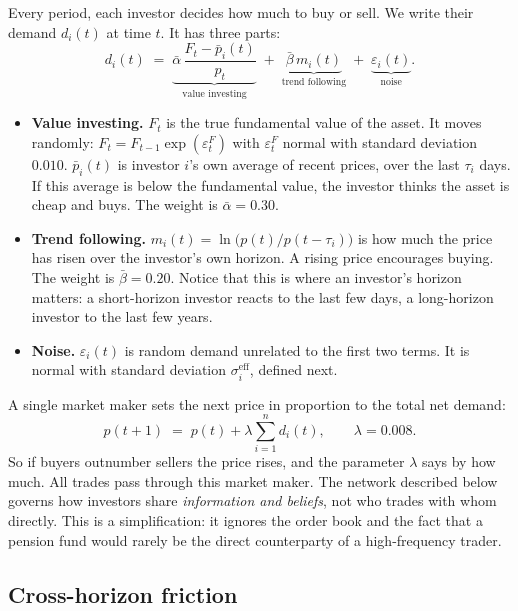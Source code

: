Every period, each investor decides how much to buy or sell. We write their demand $d_i(t)$ at time $t$. It has three parts:
\begin{equation}
d_i(t) \;=\; \underbrace{\bar\alpha\,\frac{F_t-\bar p_i(t)}{p_t}}_{\text{value investing}}
\;+\; \underbrace{\bar\beta\, m_i(t)}_{\text{trend following}}
\;+\; \underbrace{\varepsilon_i(t)}_{\text{noise}} .
\label{eq:demand}
\end{equation}

\begin{itemize}[leftmargin=*]
\item \textbf{Value investing.} $F_t$ is the true fundamental value of the asset. It moves randomly: $F_t = F_{t-1}\exp(\varepsilon^F_t)$ with $\varepsilon^F_t$ normal with standard deviation $0.010$. $\bar p_i(t)$ is investor $i$'s own average of recent prices, over the last $\tau_i$ days. If this average is below the fundamental value, the investor thinks the asset is cheap and buys. The weight is $\bar\alpha = 0.30$.
\item \textbf{Trend following.} $m_i(t)=\ln\big(p(t)/p(t-\tau_i)\big)$ is how much the price has risen over the investor's own horizon. A rising price encourages buying. The weight is $\bar\beta=0.20$. Notice that this is where an investor's horizon matters: a short-horizon investor reacts to the last few days, a long-horizon investor to the last few years.
\item \textbf{Noise.} $\varepsilon_i(t)$ is random demand unrelated to the first two terms. It is normal with standard deviation $\sigma_i^{\mathrm{eff}}$, defined next.
\end{itemize}

A single market maker sets the next price in proportion to the total net demand:
\begin{equation}
p(t+1) \;=\; p(t) + \lambda \sum_{i=1}^{n} d_i(t), \qquad \lambda = 0.008 .
\label{eq:price}
\end{equation}
So if buyers outnumber sellers the price rises, and the parameter $\lambda$ says by how much. All trades pass through this market maker. The network described below governs how investors share \emph{information and beliefs}, not who trades with whom directly. This is a simplification: it ignores the order book and the fact that a pension fund would rarely be the direct counterparty of a high-frequency trader.

\subsection{Cross-horizon friction}

